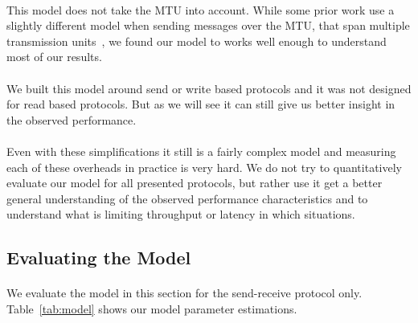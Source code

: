 \paragraph{} This model does not take the MTU into account. While some prior work use a slightly different model when sending 
messages over the MTU, that span multiple transmission units~\cite{dare}, we found our model to works well enough to understand
most of our results.

\paragraph{} We built this model around send or write based protocols and it was not designed 
for read based protocols. But as we will see it can still give us better insight in the observed performance.

\paragraph{} Even with these simplifications it still is a fairly complex model and measuring each of these overheads in 
practice is very hard. We do not try to quantitatively evaluate our model for all presented protocols, but rather use it 
get a better general understanding of the observed performance characteristics and to understand what is limiting throughput
or latency in which situations.

\pagebreak
\subsection{Evaluating the Model}

\paragraph{} We evaluate the model in this section for the send-receive protocol only. Table~\ref{tab:model} shows our model
parameter estimations. 

